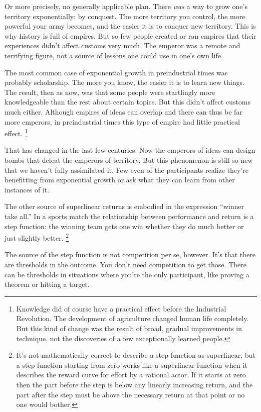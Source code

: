 \documentclass[12pt]{book}
\begin{document}
Or more precisely, no generally applicable plan. There \emph{was} a way
to grow one's territory exponentially: by conquest. The more territory
you control, the more powerful your army becomes, and the easier it is
to conquer new territory. This is why history is full of empires. But so
few people created or ran empires that their experiences didn't affect
customs very much. The emperor was a remote and terrifying figure, not a
source of lessons one could use in one's own life.

The most common case of exponential growth in preindustrial times was
probably scholarship. The more you know, the easier it is to learn new
things. The result, then as now, was that some people were startlingly
more knowledgeable than the rest about certain topics. But this didn't
affect customs much either. Although empires of ideas can overlap and
there can thus be far more emperors, in preindustrial times this type of
empire had little practical effect. \footnote{Knowledge did of course have a practical effect before the
Industrial Revolution. The development of agriculture changed human life
completely. But this kind of change was the result of broad, gradual
improvements in technique, not the discoveries of a few exceptionally
learned people.}

That has changed in the last few centuries. Now the emperors of ideas
can design bombs that defeat the emperors of territory. But this
phenomenon is still so new that we haven't fully assimilated it. Few
even of the participants realize they're benefitting from exponential
growth or ask what they can learn from other instances of it.

The other source of superlinear returns is embodied in the expression
``winner take all.'' In a sports match the relationship between
performance and return is a step function: the winning team gets one win
whether they do much better or just slightly better.
\footnote{It's not mathematically correct to describe a step function as
superlinear, but a step function starting from zero works like a
superlinear function when it describes the reward curve for effort by a
rational actor. If it starts at zero then the part before the step is
below any linearly increasing return, and the part after the step must
be above the necessary return at that point or no one would bother.}

The source of the step function is not competition per se, however. It's
that there are thresholds in the outcome. You don't need competition to
get those. There can be thresholds in situations where you're the only
participant, like proving a theorem or hitting a target.
\end{document}
